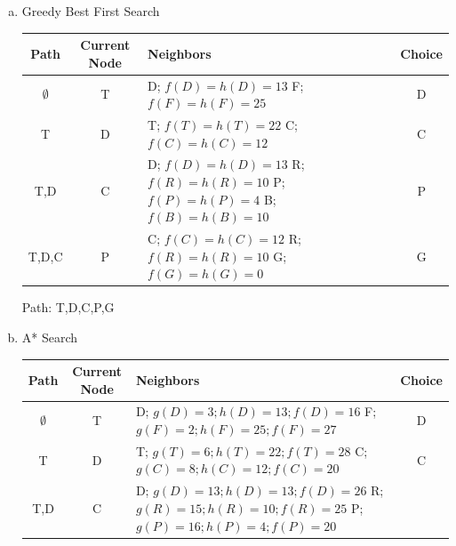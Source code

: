 \documentclass{math}
\begin{document}
\begin{enumerate}[(a)]
  \item Greedy Best First Search
  \begin{center}
    \begin{tabular}{|c|c|p{6cm}|c|}
      \hline
      Path & Current Node & Neighbors & Choice \\ \hline
      \( \emptyset \) & T &
        D; \( f(D) = h(D) = 13 \) \newline
        F; \( f(F) = h(F) = 25 \)
        & D \\ \hline
      T & D &
        T; \( f(T) = h(T) = 22 \) \newline
        C; \( f(C) = h(C) = 12 \)
        & C \\ \hline
      T,D & C &
        D; \( f(D) = h(D) = 13 \) \newline
        R; \( f(R) = h(R) = 10 \) \newline
        P; \( f(P) = h(P) = 4 \) \newline
        B; \( f(B) = h(B) = 10 \)
        & P \\ \hline
      T,D,C & P &
        C; \( f(C) = h(C) = 12 \) \newline
        R; \( f(R) = h(R) = 10 \) \newline
        G; \( f(G) = h(G) = 0 \)
        & G \\ \hline
    \end{tabular}
  \end{center}
  Path: T,D,C,P,G
  \item A* Search
  \begin{center}
    \begin{tabular}{|c|c|p{8cm}|c|}
      \hline
      Path & Current Node & Neighbors & Choice \\ \hline
      \( \emptyset \) & T &
        D; \( g(D) = 3; h(D) = 13; f(D) = 16 \) \newline
        F; \( g(F) = 2; h(F) = 25; f(F) = 27 \)
        & D \\ \hline
      T & D &
        T; \( g(T) = 6; h(T) = 22; f(T) = 28 \) \newline
        C; \( g(C) = 8; h(C) = 12; f(C) = 20 \)
        & C \\ \hline
      T,D & C &
        D; \( g(D) = 13; h(D) = 13; f(D) = 26 \) \newline
        R; \( g(R) = 15; h(R) = 10; f(R) = 25 \) \newline
        P; \( g(P) = 16; h(P) = 4; f(P) = 20 \) \newline

\end{tabular}
\end{center}
\end{enumerate}
\end{document}
